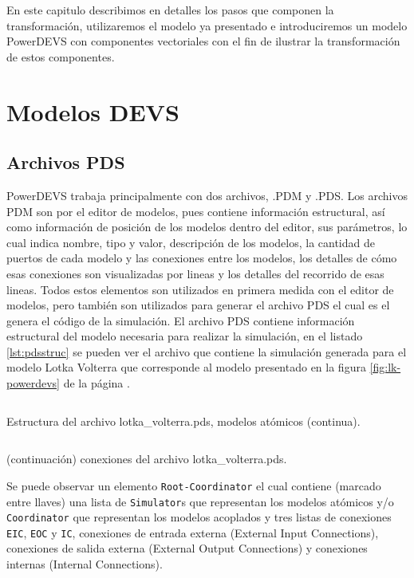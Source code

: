 	En este capitulo describimos en detalles los pasos que componen la transformación, utilizaremos el modelo ya presentado e introduciremos un modelo 
	PowerDEVS con componentes vectoriales con el fin de ilustrar la transformación de estos componentes.

\section{Modelos DEVS}

        \subsection{Archivos PDS}
        PowerDEVS trabaja principalmente con dos archivos, .PDM y .PDS.
        Los archivos PDM son  por el editor de modelos, pues contiene información estructural, así como información de posición de los modelos dentro del 
        editor, sus parámetros, lo cual indica nombre, tipo y valor, descripción de los modelos, la cantidad de puertos de cada modelo y las conexiones
        entre los modelos, los detalles de cómo esas conexiones son visualizadas por lineas y los detalles del recorrido de esas lineas. 
        Todos estos elementos son utilizados en primera medida con el editor de modelos, pero también son utilizados para generar el archivo PDS el cual es el 
        genera el código de la simulación.
        El archivo PDS contiene información estructural del modelo necesaria para realizar la simulación, en el listado \ref{lst:pdsstruc} se pueden ver el
	archivo que contiene la simulación generada para el modelo Lotka Volterra que corresponde al modelo presentado en la figura \ref{fig:lk-powerdevs} 
	de la página \pageref{fig:lk-powerdevs}.

\begin{listing}[H]
        \inputminted[linenos,breaklines=true,lastline=32]{modelica}{src/lotka_volterra.pds}
\caption{Estructura del archivo lotka\_volterra.pds, modelos atómicos (continua).}
\label{lst:pdsstruc}
\end{listing}


\begin{listing}[H]
        \inputminted[firstline=33,linenos,breaklines=true]{modelica}{src/lotka_volterra.pds}
\caption{(continuación) conexiones del archivo lotka\_volterra.pds.}
\label{lst:pdsstruc-cont}
\end{listing}

        Se puede observar un elemento \texttt{Root-Coordinator} el cual contiene (marcado entre llaves) una lista de \texttt{Simulator}s que representan 
        los modelos atómicos y/o \texttt{Coordinator} que representan los modelos acoplados y tres listas de 
        conexiones \texttt{EIC}, \texttt{EOC} y \texttt{IC}, conexiones de entrada externa (External Input Connections), 
        conexiones de salida externa (External Output Connections) y conexiones internas (Internal Connections).

